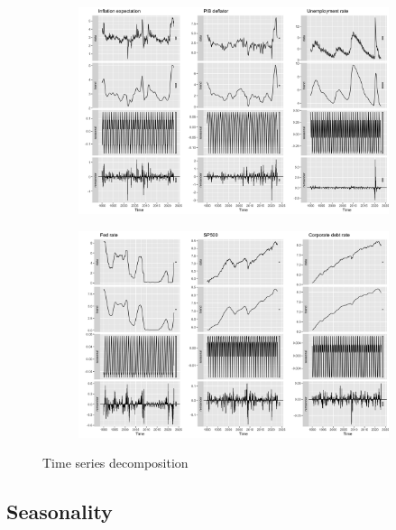 \documentclass[hidelinks,12pts]{article}
\DeclareMathOperator{\1}{\mathbbm{1}}
\begin{document}
\begin{figure}[h!]
    \centering
    \begin{subfigure}[b]{0.9\textwidth}
        \centering
        \includegraphics[width=\textwidth]{IMAGES/decomposition_i.png}
        \caption*{}
    \end{subfigure}
    \hfill
    \begin{subfigure}[b]{0.9\textwidth}
        \centering
        \includegraphics[width=\textwidth]{IMAGES/decomposition_ii.png}
        \caption*{}
    \end{subfigure}
    \hfill 
    \caption{Time series decomposition}
    \label{fig:decomposition}
\end{figure}







    \subsection{Seasonality} \label{sec:adf}
\end{document}
